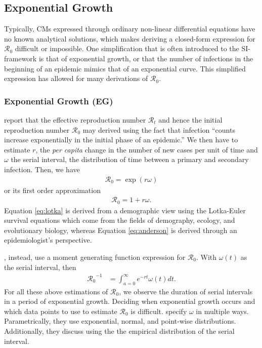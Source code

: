 \documentclass[12pt]{article}
\newcommand{\rr}{\ensuremath{\mathcal{R}_0}}
\begin{document}

\subsection{Exponential Growth}\label{sec:exp-growth}
Typically, CMs expressed through ordinary non-linear differential equations have no known analytical solutions, which makes deriving a closed-form expression for $\rr$ difficult or impossible.  One simplification that is often introduced to the SI-framework is that of exponential growth, or that the number of infections in the beginning of an epidemic mimics that of an exponential curve.  This simplified expression has allowed for many derivations of $\rr$.


\subsubsection{Exponential Growth (EG)}
\label{sec:expgrowth}
\cite{wallinga2007generation} report that the effective reproduction number $\mathcal{R}_t$ and hence the initial reproduction number $\rr$ may derived using the fact that infection ``counts increase exponentially in the initial phase of an epidemic.''  We then have to estimate $r$, the \textit{per capita} change in the number of new cases per unit of time and $\omega$ the serial interval, the distribution of time between a primary and secondary infection. Then, we have
\begin{align}\label{eq:lotka}
\rr = \exp{(r \omega)}
\end{align}
or its first order approximation
\begin{align}\label{eq:anderson}
\rr = 1 + r \omega.
\end{align}
Equation \eqref{eq:lotka} is derived from a demographic view using the Lotka-Euler survival equations which come from the fields of demography, ecology, and evolutionary biology, whereas Equation \eqref{eq:anderson} is derived through an epidemiologist's perspective. 

\cite{wallinga2007generation}, instead, use a moment generating function expression for $\rr$.  With $\omega(t)$ as the serial interval, then
\begin{align*}
\rr^{-1} &= \int_{a=0}^\infty e^{-rt}\omega(t)dt.
\end{align*}
For all these above estimations of $\rr$, we observe the duration of serial intervals in a period of exponential growth.  Deciding when exponential growth occurs and which data points to use to estimate $\rr$ is difficult.  \citeauthor{wallinga2007generation} specify $\omega$ in multiple ways.  Parametrically, they use exponential, normal, and point-wise distributions.  Additionally, they discuss using the the empirical distribution of the serial interval.
\end{document}
